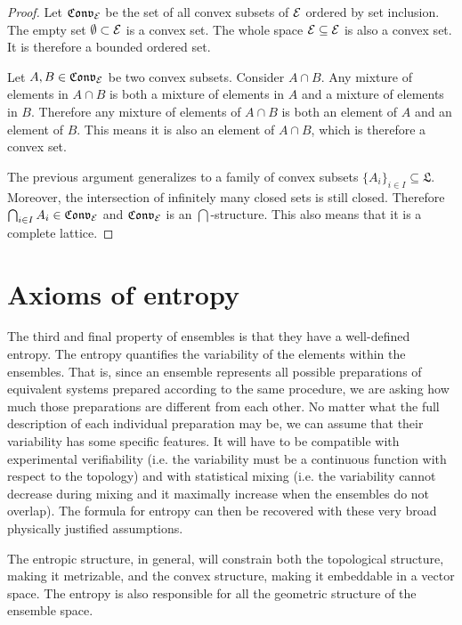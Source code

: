 \begin{proof}
	Let $\mathfrak{Conv}_{\mathcal{E}}$ be the set of all convex subsets of $\mathcal{E}$ ordered by set inclusion. The empty set $\emptyset \subset \mathcal{E}$ is a convex set. The whole space $\mathcal{E} \subseteq \mathcal{E}$ is also a convex set. It is therefore a bounded ordered set.
	
	Let $A, B \in \mathfrak{Conv}_{\mathcal{E}}$ be two convex subsets. Consider $A \cap B$. Any mixture of elements in $A \cap B$ is both a mixture of elements in $A$ and a mixture of elements in $B$. Therefore any mixture of elements of $A \cap B$ is both an element of $A$ and an element of $B$. This means it is also an element of $A \cap B$, which is therefore a convex set.
	
	The previous argument generalizes to a family of convex subsets $\{A_i\}_{i \in I} \subseteq \mathfrak{L}$. Moreover, the intersection of infinitely many closed sets is still closed. Therefore $\bigcap_{i \in I} A_i \in \mathfrak{Conv}_{\mathcal{E}}$ and $\mathfrak{Conv}_{\mathcal{E}}$ is an $\bigcap$-structure. This also means that it is a complete lattice.
\end{proof}

\section{Axioms of entropy}

The third and final property of ensembles is that they have a well-defined entropy. The entropy quantifies the variability of the elements within the ensembles. That is, since an ensemble represents all possible preparations of equivalent systems prepared according to the same procedure, we are asking how much those preparations are different from each other. No matter what the full description of each individual preparation may be, we can assume that their variability has some specific features. It will have to be compatible with experimental verifiability (i.e. the variability must be a continuous function with respect to the topology) and with statistical mixing (i.e. the variability cannot decrease during mixing and it maximally increase when the ensembles do not overlap). The formula for entropy can then be recovered with these very broad physically justified assumptions.

The entropic structure, in general, will constrain both the topological structure, making it metrizable, and the convex structure, making it embeddable in a vector space. The entropy is also responsible for all the geometric structure of the ensemble space.

